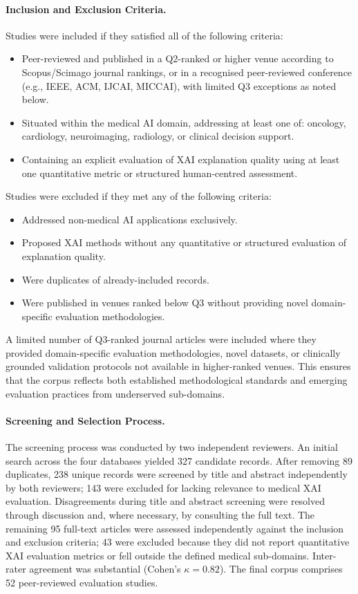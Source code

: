 \paragraph{Inclusion and Exclusion Criteria.}
Studies were included if they satisfied all of the following criteria:
\begin{itemize}
    \item[(I1)] Peer-reviewed and published in a Q2-ranked or higher venue according to Scopus/Scimago journal rankings, or in a recognised peer-reviewed conference (e.g., IEEE, ACM, IJCAI, MICCAI), with limited Q3 exceptions as noted below.
    \item[(I2)] Situated within the medical AI domain, addressing at least one of: oncology, cardiology, neuroimaging, radiology, or clinical decision support.
    \item[(I3)] Containing an explicit evaluation of XAI explanation quality using at least one quantitative metric or structured human-centred assessment.
\end{itemize}

Studies were excluded if they met any of the following criteria:
\begin{itemize}
    \item[(E1)] Addressed non-medical AI applications exclusively.
    \item[(E2)] Proposed XAI methods without any quantitative or structured evaluation of explanation quality.
    \item[(E3)] Were duplicates of already-included records.
    \item[(E4)] Were published in venues ranked below Q3 without providing novel domain-specific evaluation methodologies.
\end{itemize}

A limited number of Q3-ranked journal articles were included where they provided domain-specific evaluation methodologies, novel datasets, or clinically grounded validation protocols not available in higher-ranked venues. This ensures that the corpus reflects both established methodological standards and emerging evaluation practices from underserved sub-domains.

\paragraph{Screening and Selection Process.}
The screening process was conducted by two independent reviewers. An initial search across the four databases yielded 327 candidate records. After removing 89 duplicates, 238 unique records were screened by title and abstract independently by both reviewers; 143 were excluded for lacking relevance to medical XAI evaluation. Disagreements during title and abstract screening were resolved through discussion and, where necessary, by consulting the full text. The remaining 95 full-text articles were assessed independently against the inclusion and exclusion criteria; 43 were excluded because they did not report quantitative XAI evaluation metrics or fell outside the defined medical sub-domains. Inter-rater agreement was substantial (Cohen's $\kappa = 0.82$). The final corpus comprises 52 peer-reviewed evaluation studies.

